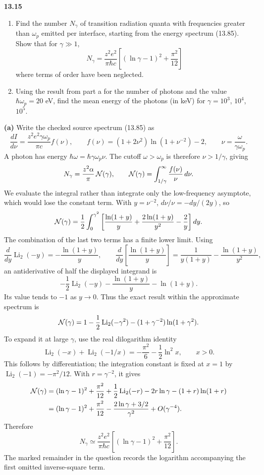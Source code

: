 \par\bigskip
\noindent\textbf{13.15}\quad\begin{enumerate}
\item[(a)] Find the number $N_{\gamma}$ of transition radiation quanta with frequencies greater than $\omega_{p}$ emitted per interface, starting from the energy spectrum (13.85). Show that for $\gamma\gg1$,
\[
N_{\gamma}=\frac{z^{2}e^{2}}{\pi\hbar c}\left[(\ln\gamma-1)^{2}+\frac{\pi^{2}}{12}\right]
\]
where terms of order  have been neglected.
\item[(b)] Using the result from part a for the number of photons and the value $\hbar\omega_{p}=20$ eV, find the mean energy of the photons (in keV) for $\gamma=10^{3}$, $10^{4}$, $10^{5}$.
\end{enumerate}
\solution
\textbf{(a)} Write the checked source spectrum (13.85) as
\[
 \frac{dI}{d\nu}=\frac{z^2e^2\gamma\omega_p}{\pi c}f(\nu),
 \qquad
 f(\nu)=(1+2\nu^2)\ln(1+\nu^{-2})-2,
 \qquad \nu=\frac{\omega}{\gamma\omega_p}.
\]
A photon has energy $\hbar\omega=\hbar\gamma\omega_p\nu$.
The cutoff $\omega>\omega_p$ is therefore $\nu>1/\gamma$, giving
\[
 N_\gamma=\frac{z^2\alpha}{\pi}\,
       {\cal N}(\gamma),\qquad
 {\cal N}(\gamma)=\int_{1/\gamma}^\infty\frac{f(\nu)}{\nu}\,d\nu.
\]
We evaluate the integral rather than integrate only the low-frequency
asymptote, which would lose the constant term. With $y=\nu^{-2}$,
$d\nu/\nu=-dy/(2y)$, so
\[
 {\cal N}(\gamma)=\frac12\int_0^{\gamma^2}
 \left[\frac{\ln(1+y)}y
       +\frac{2\ln(1+y)}{y^2}-\frac2y\right]dy.
\]
The combination of the last two terms has a finite lower limit.
Using
\[
 \frac{d}{dy}\operatorname{Li}_2(-y)=-\frac{\ln(1+y)}y,\qquad
 \frac{d}{dy}\left[\frac{\ln(1+y)}y\right]
 =\frac1{y(1+y)}-\frac{\ln(1+y)}{y^2},
\]
an antiderivative of half the displayed integrand is
\[
 -\frac12\operatorname{Li}_2(-y)
 -\frac{\ln(1+y)}y-\ln(1+y).
\]
Its value tends to $-1$ as $y\to0$. Thus the exact result within
the approximate spectrum is
\[
 {\cal N}(\gamma)
 =1-\frac12\operatorname{Li}_2(-\gamma^2)
   -(1+\gamma^{-2})\ln(1+\gamma^2).
\]
To expand it at large $\gamma$, use the real dilogarithm identity
\[
 \operatorname{Li}_2(-x)+\operatorname{Li}_2(-1/x)
 =-\frac{\pi^2}{6}-\frac12\ln^2x,\qquad x>0.
\]
This follows by differentiation; the integration constant is fixed at
$x=1$ by $\operatorname{Li}_2(-1)=-\pi^2/12$. With
$r=\gamma^{-2}$, it gives
\[
 \begin{split}
 {\cal N}(\gamma)
 &=(\ln\gamma-1)^2+\frac{\pi^2}{12}
   +\frac12\operatorname{Li}_2(-r)
   -2r\ln\gamma-(1+r)\ln(1+r)\\
 &=(\ln\gamma-1)^2+\frac{\pi^2}{12}
   -\frac{2\ln\gamma+3/2}{\gamma^2}
   +O(\gamma^{-4}).
 \end{split}
\]
Therefore
\[
 \boxed{N_\gamma\simeq\frac{z^2e^2}{\pi\hbar c}
 \left[(\ln\gamma-1)^2+\frac{\pi^2}{12}\right].}
\]
The marked remainder in the question records the logarithm accompanying
the first omitted inverse-square term.

